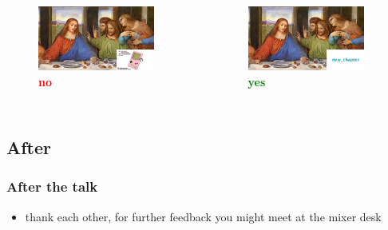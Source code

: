 \documentclass[hyperref={pdfpagelabels=false},aspectratio=169]{beamer}
\begin{document}
\begin{frame}			%
	\begin{columns}[T,onlytextwidth]
	\begin{figure} 
		\centering
		\def\svgwidth{1\textwidth}
		\includegraphics[width=0.9\textwidth]{ssrcfckup.jpg} \\
		\textcolor{red}{\textbf{no}}	
	\end{figure}
	\begin{figure} 
		\centering
		\def\svgwidth{1\textwidth}
		\includegraphics[width=0.9\textwidth]{ssrcbetter.jpg} \\
		\textcolor{green}{\textbf{yes}}	
	\end{figure}
\end{columns}
\end{frame}


\subsection{After} %
\begin{frame}
\frametitle{After the talk}
\begin{itemize}
\item thank each other, for further feedback you might meet at the mixer desk
\end{itemize} 
\end{frame}
\end{document}
